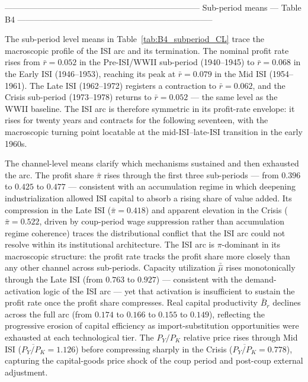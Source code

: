 \documentclass[11pt,a4paper]{article}
\begin{document}
{ -----------------------------------------------------------------------
 Sub-period means --- Table B4
 -----------------------------------------------------------------------



The sub-period level means in Table~\ref{tab:B4_subperiod_CL} trace the
macroscopic profile of the ISI arc and its termination. The nominal profit
rate rises from $\bar{r} = 0.052$ in the Pre-ISI/WWII sub-period
(1940--1945) to $\bar{r} = 0.068$ in the Early ISI (1946--1953), reaching
its peak at $\bar{r} = 0.079$ in the Mid ISI (1954--1961). The Late ISI
(1962--1972) registers a contraction to $\bar{r} = 0.062$, and the Crisis
sub-period (1973--1978) returns to $\bar{r} = 0.052$ --- the same level
as the WWII baseline. The ISI arc is therefore symmetric in its profit-rate
envelope: it rises for twenty years and contracts for the following
seventeen, with the macroscopic turning point locatable at the
mid-ISI--late-ISI transition in the early 1960s.

The channel-level means clarify which mechanisms sustained and then
exhausted the arc. The profit share $\bar{\pi}$ rises through the first
three sub-periods --- from $0.396$ to $0.425$ to $0.477$ --- consistent
with an accumulation regime in which deepening industrialization allowed
ISI capital to absorb a rising share of value added. Its compression in
the Late ISI ($\bar{\pi} = 0.418$) and apparent elevation in the Crisis
($\bar{\pi} = 0.522$, driven by coup-period wage suppression rather than
accumulation regime coherence) traces the distributional conflict that the
ISI arc could not resolve within its institutional architecture. The ISI arc
is $\pi$-dominant in its macroscopic structure: the profit rate tracks the
profit share more closely than any other channel across sub-periods.
Capacity utilization $\bar{\hat{\mu}}$ rises monotonically through the Late
ISI (from $0.763$ to $0.927$) --- consistent with the demand-activation
logic of the ISI arc --- yet that activation is insufficient to sustain the
profit rate once the profit share compresses. Real capital productivity
$\bar{B}_r$ declines across the full arc (from $0.174$ to $0.166$ to
$0.155$ to $0.149$), reflecting the progressive erosion of capital
efficiency as import-substitution opportunities were exhausted at each
technological tier. The $P_Y/P_K$ relative price rises through Mid ISI
($\overline{P_Y/P_K} = 1.126$) before compressing sharply in the Crisis
($\overline{P_Y/P_K} = 0.778$), capturing the capital-goods price shock
of the coup period and post-coup external adjustment.

}
\end{document}
